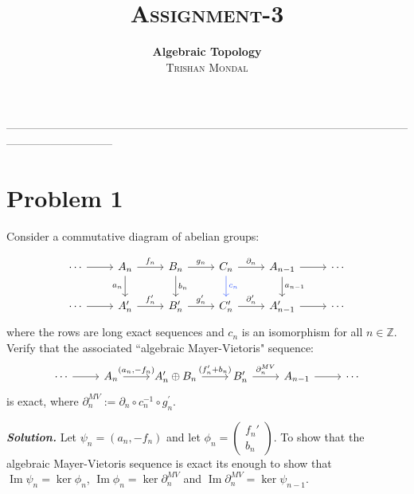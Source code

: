 \documentclass[11pt]{article}
\newcommand{\p}{\partial}
\newcommand{\sol}{ \textbf{\textit{Solution.}} }
\begin{document}
 
 \title{{\Huge \textsc{Assignment-3}}}
 \author{\textbf{ \textsf{Algebraic Topology}} \\[0.2cm]
 \large \textsc{Trishan Mondal}}
 \date{}
 \maketitle

 ----------------------------------------------------------------------------------------------------------------------------------------- 

 \section{Problem 1} 

 \begin{prob}{}{}
    Consider a commutative diagram of abelian groups:

    \[\begin{tikzcd}
        \cdots & {A_n} & {B_n} & {C_n} & {A_{n-1}} & \cdots \\
        \cdots & {A_n'} & {B_n'} & {C_n'} & {A_{n-1}'} & \cdots
        \arrow[from=1-5, to=1-6]
        \arrow[from=2-5, to=2-6]
        \arrow[from=1-1, to=1-2]
        \arrow[from=2-1, to=2-2]
        \arrow["{f_n}", from=1-2, to=1-3]
        \arrow["{g_n}", from=1-3, to=1-4]
        \arrow["{\p_n}", from=1-4, to=1-5]
        \arrow["{f'_n}", from=2-2, to=2-3]
        \arrow["{g'_n}", from=2-3, to=2-4]
        \arrow["{\p'_n}", from=2-4, to=2-5]
        \arrow["{a_n}"', from=1-2, to=2-2]
        \arrow["{b_n }", from=1-3, to=2-3]
        \arrow["{c_n}", color={rgb,255:red,36;green,76;blue,255}, from=1-4, to=2-4]
        \arrow["{a_{n-1}}", from=1-5, to=2-5]
    \end{tikzcd}\]
    where the rows are long exact sequences and $c_{n}$ is an isomorphism for all $n \in \mathbb{Z}$. Verify that the associated ``algebraic Mayer-Vietoris" sequence:
   \[\begin{tikzcd}
	\cdots & {A_n} & {A_n'\oplus B_n} & {B_n'} & {A_{n-1}} & \cdots
	\arrow[from=1-5, to=1-6]
	\arrow[from=1-1, to=1-2]
	\arrow["{(a_n,-f_n)}", from=1-2, to=1-3]
	\arrow["{(f_n'+b_n)}", from=1-3, to=1-4]
	\arrow["{\p^{MV}_n}", from=1-4, to=1-5]
     \end{tikzcd}
    \] 
    is exact, where $\partial_{n}^{M V}:=\partial_{n} \circ c_{n}^{-1} \circ g_{n}^{\prime}$.
 \end{prob} 

 \sol Let $\psi_n = (a_n, -f_n)$ and let $\phi_n = \begin{pmatrix} f_n' \\ b_n \end{pmatrix}$. To show that the \textsf{algebraic Mayer-Vietoris sequence} is exact its enough to show that $\operatorname{Im}\psi_n = \ker\phi_n$, $\operatorname{Im} \phi_n = \ker\p^{MV}_n$ and $\operatorname{Im}\p_n^{MV} = \ker\psi_{n-1}$.
\end{document}
